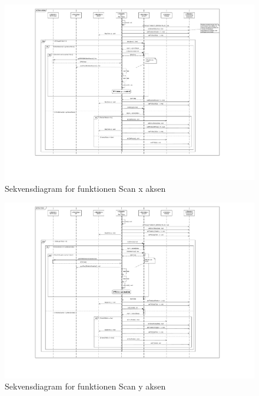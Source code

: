 \begin{figure}[H]
	\caption{Sekvensdiagram for funktionen Scan x aksen}
	\label{SD:PSoC:ScanX}
	\includegraphics[scale=0.29,trim=200 150 0 0, clip]{APPSoC/SD-Scan-x-aksen}
\end{figure}

\begin{figure}[H]
	\caption{Sekvensdiagram for funktionen Scan y aksen}
	\label{SD:PSoC:ScanY}
	\includegraphics[scale=0.29,trim=200 100 0 0,clip]{APPSoC/SD-Scan-y-aksen}
\end{figure}

